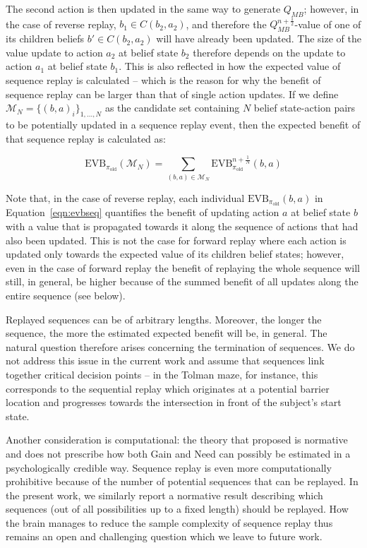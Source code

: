The second action is then updated in the same way to generate $Q_{MB}$; however, in the case of reverse replay, $b_1 \in C(b_2, a_2)$, and therefore the $Q_{MB}^{n+\frac{1}{2}}$-value of one of its children beliefs $b'\in C(b_2, a_2)$ will have already been updated. The size of the value update to action $a_2$ at belief state $b_2$ therefore depends on the update to action $a_1$ at belief state $b_1$. This is also reflected in how the expected value of sequence replay is calculated -- which is the reason for why the benefit of sequence replay can be larger than that of single action updates. If we define $\mathcal{M}_N=\{ (b, a)_{i} \}_{1, ..., N}$ as the candidate set containing $N$ belief state-action pairs to be potentially updated in a sequence replay event, then the expected benefit of that sequence replay is calculated as:

\begin{equation}
    \text{EVB}_{\pi_{\text{old}}}(\mathcal{M}_{N}) = \sum_{(b, a) \in \mathcal{M}_N} \text{EVB}_{\pi_{\text{old}}}^{n+\frac{1}{N}}(b, a)
    \label{eqn:evbseq}
\end{equation}

Note that, in the case of reverse replay, each individual $\text{EVB}_{\pi_{\text{old}}}(b, a)$ in Equation~\ref{eqn:evbseq} quantifies the benefit of updating action $a$ at belief state $b$ with a value that is propagated towards it along the sequence of actions that had also been updated. This is not the case for forward replay where each action is updated only towards the expected value of its children belief states; however, even in the case of forward replay the benefit of replaying the whole sequence will still, in general, be higher because of the summed benefit of all updates along the entire sequence (see below).

Replayed sequences can be of arbitrary lengths. Moreover, the longer the sequence, the more the estimated expected benefit will be, in general. The natural question therefore arises concerning the termination of sequences. We do not address this issue in the current work and assume that sequences link together critical decision points -- in the Tolman maze, for instance, this corresponds to the sequential replay which originates at a potential barrier location and progresses towards the intersection in front of the subject's start state. 

Another consideration is computational: the theory that \textcite{mattarPrioritizedMemoryAccess2018} proposed is normative and does not prescribe how both Gain and Need can possibly be estimated in a psychologically credible way. Sequence replay is even more computationally prohibitive because of the number of potential sequences that can be replayed. In the present work, we similarly report a normative result describing which sequences (out of all possibilities up to a fixed length) should be replayed. How the brain manages to reduce the sample complexity of sequence replay thus remains an open and challenging question which we leave to future work.

